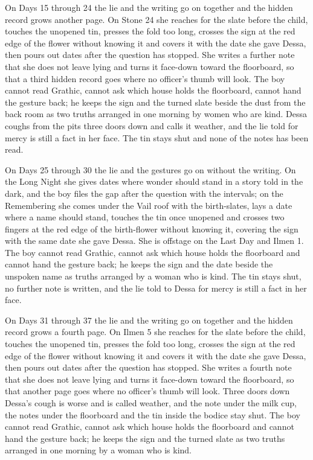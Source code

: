 \documentclass{design/chronicle}
\begin{document}
{On Days 15 through 24 the lie and the writing go on together and the hidden record grows another page. On Stone 24 she reaches for the slate before the child, touches the unopened tin, presses the fold too long, crosses the sign at the red edge of the flower without knowing it and covers it with the date she gave Dessa, then pours out dates after the question has stopped. She writes a further note that she does not leave lying and turns it face-down toward the floorboard, so that a third hidden record goes where no officer’s thumb will look. The boy cannot read Grathic, cannot ask which house holds the floorboard, cannot hand the gesture back; he keeps the sign and the turned slate beside the dust from the back room as two truths arranged in one morning by women who are kind. Dessa coughs from the pits three doors down and calls it weather, and the lie told for mercy is still a fact in her face. The tin stays shut and none of the notes has been read.

On Days 25 through 30 the lie and the gestures go on without the writing. On the Long Night she gives dates where wonder should stand in a story told in the dark, and the boy files the gap after the question with the intervals; on the Remembering she comes under the Vail roof with the birth-slates, lays a date where a name should stand, touches the tin once unopened and crosses two fingers at the red edge of the birth-flower without knowing it, covering the sign with the same date she gave Dessa. She is offstage on the Last Day and Ilmen 1. The boy cannot read Grathic, cannot ask which house holds the floorboard and cannot hand the gesture back; he keeps the sign and the date beside the unspoken name as truths arranged by a woman who is kind. The tin stays shut, no further note is written, and the lie told to Dessa for mercy is still a fact in her face.

On Days 31 through 37 the lie and the writing go on together and the hidden record grows a fourth page. On Ilmen 5 she reaches for the slate before the child, touches the unopened tin, presses the fold too long, crosses the sign at the red edge of the flower without knowing it and covers it with the date she gave Dessa, then pours out dates after the question has stopped. She writes a fourth note that she does not leave lying and turns it face-down toward the floorboard, so that another page goes where no officer’s thumb will look. Three doors down Dessa’s cough is worse and is called weather, and the note under the milk cup, the notes under the floorboard and the tin inside the bodice stay shut. The boy cannot read Grathic, cannot ask which house holds the floorboard and cannot hand the gesture back; he keeps the sign and the turned slate as two truths arranged in one morning by a woman who is kind.

}
\end{document}
